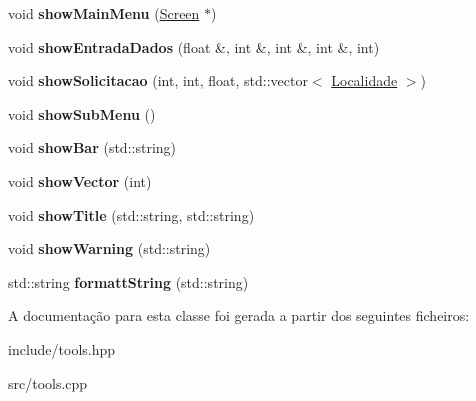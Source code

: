 \begin{DoxyCompactItemize}
void {\bfseries show\+Main\+Menu} (\hyperlink{classScreen}{Screen} $\ast$)
\item 
\mbox{\label{classScreen_a7b425f6ea8830066c837f84e09f493a0}} 
void {\bfseries show\+Entrada\+Dados} (float \&, int \&, int \&, int \&, int)
\item 
\mbox{\label{classScreen_a2f514fb5d139b0b6e8d67c95ee6a2596}} 
void {\bfseries show\+Solicitacao} (int, int, float, std\+::vector$<$ \hyperlink{classLocalidade}{Localidade} $>$)
\item 
\mbox{\label{classScreen_ac974e1d0dc9ab1f4c9be2d8f70d763c7}} 
void {\bfseries show\+Sub\+Menu} ()
\item 
\mbox{\label{classScreen_a16bd8465322e12b669e26ecccd4a3704}} 
void {\bfseries show\+Bar} (std\+::string)
\item 
\mbox{\label{classScreen_aca2a46f65496651c74b66e807f7ed421}} 
void {\bfseries show\+Vector} (int)
\item 
\mbox{\label{classScreen_aefbd91aee5978143823031767159caf7}} 
void {\bfseries show\+Title} (std\+::string, std\+::string)
\item 
\mbox{\label{classScreen_a5fc8c4449368a8507f03bf3243677f1e}} 
void {\bfseries show\+Warning} (std\+::string)
\item 
\mbox{\label{classScreen_adf71f664da30bb0311e4a5033de5938f}} 
std\+::string {\bfseries formatt\+String} (std\+::string)
\end{DoxyCompactItemize}


A documentação para esta classe foi gerada a partir dos seguintes ficheiros\+:\begin{DoxyCompactItemize}
\item 
include/tools.\+hpp\item 
src/tools.\+cpp\end{DoxyCompactItemize}
